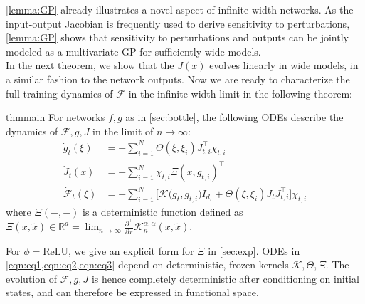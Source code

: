 \documentclass{article}
\theoremstyle{definition}
\theoremstyle{remark}
\renewcommand{\[}{\begin{eqnarray}}
\renewcommand{\]}{\end{eqnarray}}
\renewcommand{\[}{\begin{eqnarray}}
\renewcommand{\]}{\end{eqnarray}}
\newcommand{\R}{\mathbb{R}}
\newcommand{\F}{\mathcal{F}}
\begin{document}
\cref{lemma:GP} already illustrates a novel aspect of infinite width networks. As the input-output Jacobian is frequently used to derive sensitivity to perturbations, \cref{lemma:GP} shows that sensitivity to perturbations and outputs can be jointly modeled as a multivariate GP for sufficiently wide models.  \\
In the next theorem, we show that the $J(x)$ evolves linearly in wide models, in a similar fashion to the network outputs. Now we are ready to characterize the full training dynamics of $\F$ in the infinite width limit in the following theorem:
\begin{restatable}{thm}{main}\label{thm:main}
For networks $f,g$ as in \cref{sec:bottle}, the following ODEs describe the dynamics of $\F,g,J$ in the limit of $n \to \infty$:
\begin{align}
\dot{g}_t(\xi) &= -\sum_{i=1}^N\Theta(\xi,\xi_i)J_{t,i}^\top\chi_{t,i} \label{eqn:eq1}\\
\dot{J}_t(x) &= - \sum_{i=1}^N\chi_{t,i}\Xi(x,g_{t,i})^\top \label{eqn:eq2}\\
\dot{\F}_t(\xi) &= -\sum_{i=1}^N\Big[\mathcal{K}\big(g_t,g_{t,i}\big)I_{d_r} + 
\Theta(\xi,\xi_i)J_tJ_{t,i}^{\top}\Big]\chi_{t,i} \label{eqn:eq3}
\end{align}
where $\Xi(-,-)$ is a deterministic function defined as $\Xi(x,\tilde{x}) \in \R^{ d } = \lim_{n \to \infty} \frac{\partial^\top}{\partial x}\mathcal{K}_n^{\alpha,\alpha}(x,\tilde{x})$.
\end{restatable}
For $\phi = \text{ReLU}$, we give an explicit form for $\Xi$ in \cref{sec:exp}. 
ODEs in \cref{eqn:eq1,eqn:eq2,eqn:eq3} depend on deterministic, frozen kernels $\mathcal{K},\Theta,\Xi$. The evolution of $\F,g,J$ is hence completely deterministic after conditioning on initial states, and can therefore be expressed in functional space.

\end{document}
